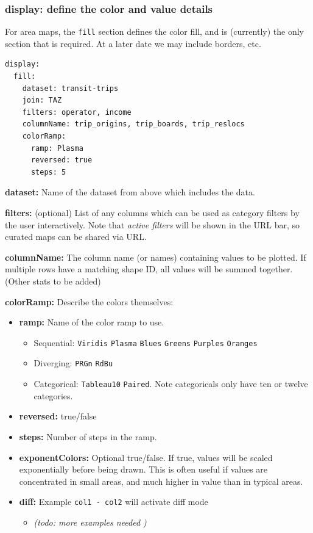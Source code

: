 \hypertarget{display-define-the-color-and-value-details}{%
\subsubsection{\texorpdfstring{\textbf{display:} define the color and
value
details}{display: define the color and value details}}\label{display-define-the-color-and-value-details}}

For area maps, the \texttt{fill} section defines the color fill, and is
(currently) the only section that is required. At a later date we may
include borders, etc.

\begin{lstlisting}
display:
  fill:
    dataset: transit-trips
    join: TAZ
    filters: operator, income
    columnName: trip_origins, trip_boards, trip_reslocs
    colorRamp:
      ramp: Plasma
      reversed: true
      steps: 5
\end{lstlisting}

\textbf{dataset:} Name of the dataset from above which includes the
data.

\textbf{filters:} (optional) List of any columns which can be used as
category filters by the user interactively. Note that \emph{active
filters} will be shown in the URL bar, so curated maps can be shared via
URL.

\textbf{columnName:} The column name (or names) containing values to be
plotted. If multiple rows have a matching shape ID, all values will be
summed together. (Other stats to be added)

\textbf{colorRamp:} Describe the colors themselves:

\begin{itemize}
\tightlist
\item
  \textbf{ramp:} Name of the color ramp to use.

  \begin{itemize}
  \tightlist
  \item
    Sequential: \texttt{Viridis} \texttt{Plasma} \texttt{Blues}
    \texttt{Greens} \texttt{Purples} \texttt{Oranges}
  \item
    Diverging: \texttt{PRGn} \texttt{RdBu}
  \item
    Categorical: \texttt{Tableau10} \texttt{Paired}. Note categoricals
    only have ten or twelve categories.
  \end{itemize}
\item
  \textbf{reversed:} true/false
\item
  \textbf{steps:} Number of steps in the ramp.
\item
  \textbf{exponentColors:} Optional true/false. If true, values will be
  scaled exponentially before being drawn. This is often useful if
  values are concentrated in small areas, and much higher in value than
  in typical areas.
\item
  \textbf{diff:} Example \texttt{col1\ -\ col2} will activate diff mode

  \begin{itemize}
  \tightlist
  \item
    \emph{(todo: more examples needed )}
  \end{itemize}
\end{itemize}


